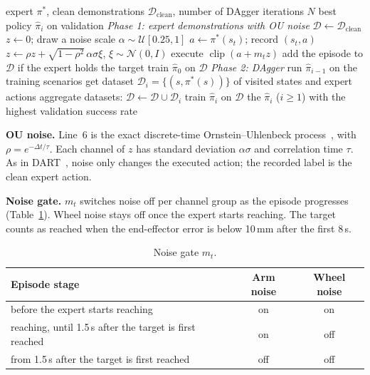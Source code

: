 \documentclass[10pt]{article}
\newcommand{\D}{\mathcal{D}}
\newcommand{\clip}{\operatorname{clip}}
\begin{document}
\begin{algorithm}[t]
\caption{f-DAgger}
\label{alg:f-dagger}
\begin{algorithmic}[1]
\Require expert $\pi^*$, clean demonstrations $\D_{\mathrm{clean}}$, number of DAgger iterations $N$
\Ensure best policy $\hat\pi_i$ on validation
\Statex \textit{Phase 1: expert demonstrations with OU noise}
\State $\D\gets\D_{\mathrm{clean}}$
  \State $z\gets 0$;\; draw a noise scale $\alpha\sim\mathcal{U}[0.25,1]$
    \State $a\gets\pi^*(s_t)$; record $(s_t,a)$ 
    \State $z\gets\rho z+\sqrt{1-\rho^2}\,\alpha\sigma\xi$,\; $\xi\sim\mathcal{N}(0,I)$ 
    \State execute $\clip(a+m_t z)$ 
  \EndFor
  \State add the episode to $\D$ if the expert holds the target
\EndFor
\State train $\hat\pi_0$ on $\D$
\Statex \textit{Phase 2: DAgger}
  \State run $\hat\pi_{i-1}$ on the training scenarios
  \State get dataset $\D_i=\{(s,\pi^*(s))\}$ of visited states and expert actions
  \State aggregate datasets: $\D\gets\D\cup\D_i$
  \State train $\hat\pi_i$ on $\D$
\EndFor
\State \Return the $\hat\pi_i$ ($i\ge1$) with the highest validation success rate
\end{algorithmic}
\end{algorithm}

\noindent\textbf{OU noise.}
Line~6 is the exact discrete-time Ornstein--Uhlenbeck process~\cite{ou}, with $\rho=e^{-\Delta t/\tau}$.
Each channel of $z$ has standard deviation $\alpha\sigma$ and correlation time $\tau$.
As in DART~\cite{dart}, noise only changes the executed action; the recorded label is the clean
expert action.

\medskip
\noindent\textbf{Noise gate.}
$m_t$ switches noise off per channel group as the episode progresses (Table~\ref{tab:gate}).
Wheel noise stays off once the expert starts reaching. The target counts as reached when the
end-effector error is below 10\,mm after the first 8\,s.

\begin{table}[h]
\centering
\small
\caption{Noise gate $m_t$.}
\label{tab:gate}
\begin{tabular}{@{}lcc@{}}
\toprule
Episode stage & Arm noise & Wheel noise \\
\midrule
before the expert starts reaching & on & on \\
reaching, until 1.5\,s after the target is first reached & on & off \\
from 1.5\,s after the target is first reached & off & off \\
\bottomrule
\end{tabular}
\end{table}
\end{document}
